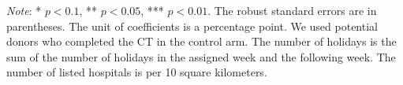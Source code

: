 \documentclass[12pt, a4paper]{article}
\begin{document}
\begin{table}[H]
\begin{threeparttable}
\begin{tabular}[t]{lcccc}
\bottomrule
\end{tabular}
\begin{tablenotes}
\item \emph{Note}: * $p < 0.1$, ** $p < 0.05$, *** $p < 0.01$. The robust standard errors are in parentheses. The unit of coefficients is a percentage point. We used potential donors who completed the CT in the control arm. The number of holidays is the sum of the number of holidays in the assigned week and the following week. The number of listed hospitals is per 10 square kilometers.
\end{tablenotes}
\end{threeparttable}
\end{table}

\begin{spacing}{1}
  
\end{spacing}
\end{document}
